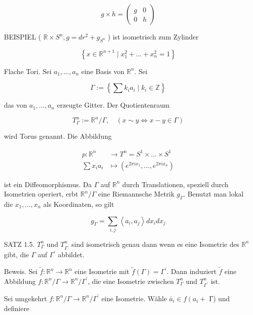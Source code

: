 \documentclass[10pt, letterpaper]{article}
\begin{document}
$$
g \times h=\left(\begin{array}{cc}
g & 0 \\
0 & h
\end{array}\right)
$$

BEISPIEL ( $\mathbb{R} \times S^{n}, g=d r^{2}+g_{S^{n}}$ ) ist isometrisch zum Zylinder

$$
\left\{x \in \mathbb{R}^{n+1} \mid x_{1}^{2}+\ldots+x_{n}^{2}=1\right\}
$$

Flache Tori. Sei $a_{1}, \ldots, a_{n}$ eine Basis von $\mathbb{R}^{n}$. Sei

$$
\Gamma:=\left\{\sum k_{i} a_{i} \mid k_{i} \in \mathbb{Z}\right\}
$$

das von $a_{1}, \ldots, a_{n}$ erzeugte Gitter. Der Quotientenraum

$$
T_{\Gamma}^{n}:=\mathbb{R}^{n} / \Gamma, \quad(x \sim y \Longleftrightarrow x-y \in \Gamma)
$$

wird Torus genannt. Die Abbildung

$$
\begin{aligned}
p: \mathbb{R}^{n} & \rightarrow T^{n}=S^{1} \times \ldots \times S^{1} \\
\sum x_{i} a_{i} & \mapsto\left(e^{2 \pi i x_{1}}, \ldots, e^{2 \pi i x_{n}}\right)
\end{aligned}
$$

ist ein Diffeomorphismus. Da $\Gamma$ auf $\mathbb{R}^{n}$ durch Translationen, speziell durch Isometrien operiert, erbt $\mathbb{R}^{n} / \Gamma$ eine Riemannsche Metrik $g_{\Gamma}$. Benutzt man lokal die $x_{1}, \ldots, x_{n}$ als Koordinaten, so gilt

$$
g_{\Gamma}=\sum_{i, j}\left\langle a_{i}, a_{j}\right\rangle d x_{i} d x_{j}
$$

SATZ 1.5. $T_{\Gamma}^{n}$ und $T_{\Gamma^{\prime}}^{n}$ sind isometrisch genau dann wenn es eine Isometrie des $\mathbb{R}^{n}$ gibt, die $\Gamma$ auf $\Gamma^{\prime}$ abbildet.

Beweis. Sei $\tilde{f}: \mathbb{R}^{n} \rightarrow \mathbb{R}^{n}$ eine Isometrie mit $\tilde{f}(\Gamma)=\Gamma^{\prime}$. Dann induziert $\tilde{f}$ eine Abbildung $f: \mathbb{R}^{n} / \Gamma \rightarrow \mathbb{R}^{n} / \Gamma^{\prime}$, die eine Isometrie zwischen $T_{\Gamma}^{n}$ und $T_{\Gamma^{\prime}}^{n}$ ist.

Sei umgekehrt $f: \mathbb{R}^{n} / \Gamma \rightarrow \mathbb{R}^{n} / \Gamma^{\prime}$ eine Isometrie. Wähle $\bar{a}_{i} \in f\left(a_{i}+\right.$ Г) und definiere
\end{document}
